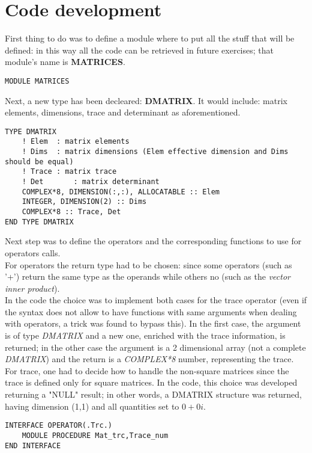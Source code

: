 \documentclass[12pt, a4paper, notitlepage]{report}
\begin{document}
\section*{Code development}
First thing to do was to define a module where to put all the stuff that will be defined: in this way all the code can be retrieved in future exercises; that module's name is \textbf{MATRICES}.\\
\begin{lstlisting}
MODULE MATRICES
\end{lstlisting}

Next, a new type has been decleared: \textbf{DMATRIX}. It would include: matrix elements, dimensions, trace and determinant as aforementioned.
\begin{lstlisting}
TYPE DMATRIX
	! Elem	: matrix elements
	! Dims	: matrix dimensions (Elem effective dimension and Dims should be equal)
	! Trace	: matrix trace
	! Det		: matrix determinant
	COMPLEX*8, DIMENSION(:,:), ALLOCATABLE :: Elem
	INTEGER, DIMENSION(2) :: Dims
	COMPLEX*8 :: Trace, Det
END TYPE DMATRIX
\end{lstlisting}

Next step was to define the operators and the corresponding functions to use for operators calls.\\
For operators the return type had to be chosen: since some operators (such as '+') return the same type as the operands while others no (such as the \textit{vector inner product}).\\
In the code the choice was to implement both cases for the trace operator (even if the syntax does not allow to have functions with same arguments when dealing with operators, a trick was found to bypass this). In the first case, the argument is of type \textit{DMATRIX} and a new one, enriched with the trace information, is returned; in the other case the argument is a 2 dimensional array (not a complete \textit{DMATRIX}) and the return is a \textit{COMPLEX*8} number, representing the trace.\\
For trace, one had to decide how to handle the non-square matrices since the trace is defined only for square matrices. In the code, this choice was developed returning a "NULL" result; in other words, a DMATRIX structure was returned, having dimension (1,1) and all quantities set to $0 + 0i$.\\
\begin{lstlisting}
INTERFACE OPERATOR(.Trc.)
	MODULE PROCEDURE Mat_trc,Trace_num
END INTERFACE
\end{lstlisting}
\end{document}
